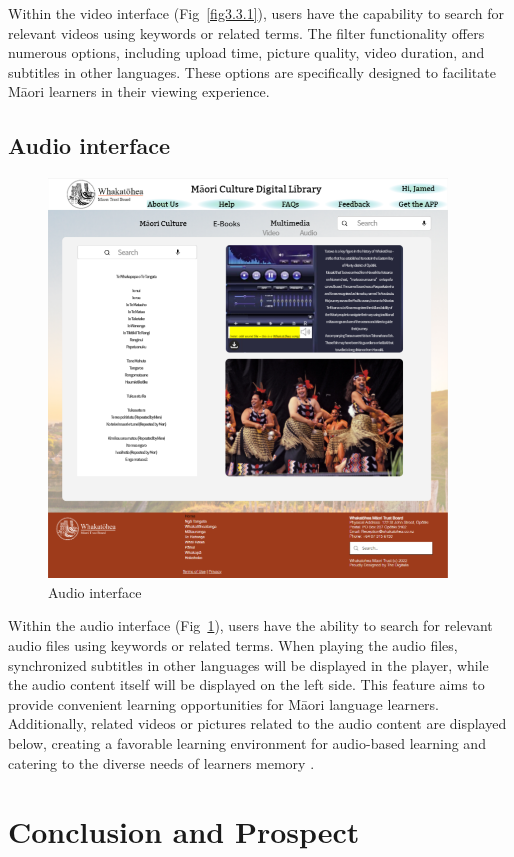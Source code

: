 Within the video interface (Fig~\ref{fig3.3.1}), users have the capability to search for relevant videos using keywords or related terms. The filter functionality offers numerous options, including upload time, picture quality, video duration, and subtitles in other languages. These options are specifically designed to facilitate Māori learners in their viewing experience.

\subsection{Audio interface}

\begin{figure}[htbp]
  \centerline{\includegraphics[width=300pt]{images/3-3-2.png}}
  \caption{Audio interface}
  \label{fig3.3.2}
\end{figure}

Within the audio interface (Fig~\ref{fig3.3.2}), users have the ability to search for relevant audio files using keywords or related terms. When playing the audio files, synchronized subtitles in other languages will be displayed in the player, while the audio content itself will be displayed on the left side. This feature aims to provide convenient learning opportunities for Māori language learners. Additionally, related videos or pictures related to the audio content are displayed below, creating a favorable learning environment for audio-based learning and catering to the diverse needs of learners memory \autocite{MaoriHis64:online}.

\section{Conclusion and Prospect}

